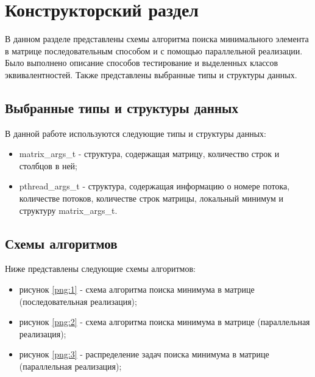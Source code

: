 \chapter{Конструкторский раздел}

В данном разделе представлены схемы алгоритма поиска минимального элемента в матрице последовательным способом и с помощью параллельной реализации. Было выполнено описание способов тестирование и выделенных классов эквивалентностей. Также представлены выбранные типы и структуры данных.

\section{Выбранные типы и структуры данных}
В данной работе используются следующие типы и структуры данных:
\begin{itemize}
	\item matrix\_args\_t - структура, содержащая матрицу, количество строк и столбцов в ней;
	\item pthread\_args\_t - структура, содержащая информацию о номере потока, количестве потоков, количестве строк матрицы, локальный минимум и структуру matrix\_args\_t.
\end{itemize}

\section{Схемы алгоритмов}
Ниже представлены следующие схемы алгоритмов:
\begin{itemize}
	\item рисунок \ref{png:1} - схема алгоритма поиска минимума в матрице (последовательная реализация);
	\begin{figure}[H]
	\end{figure}

	\newpage
	\item рисунок \ref{png:2} - схема алгоритма поиска минимума в матрице (параллельная реализация);
	\begin{figure}[H]
	\end{figure}

	\item рисунок \ref{png:3} - распределение задач поиска минимума в матрице (параллельная реализация);
	\begin{figure}[H]
	\end{figure}
\end{itemize}

